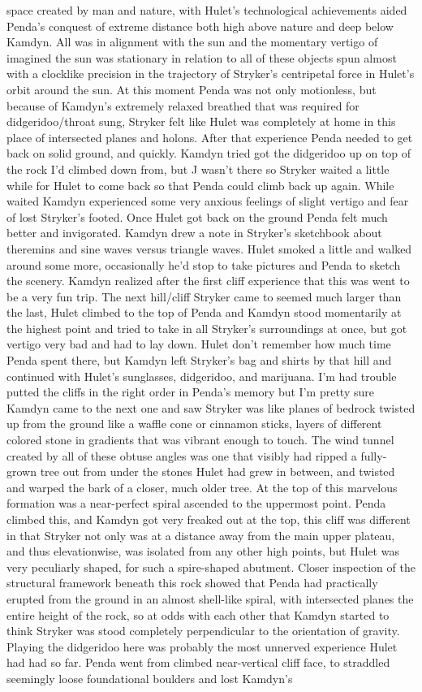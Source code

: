 \documentclass[12pt]{book}
\begin{document}
space created by man and nature, with Hulet's technological achievements aided Penda's conquest of extreme distance both high above nature and deep below Kamdyn. All was in alignment with the sun and the momentary vertigo of imagined the sun was stationary in relation to all of these objects spun almost with a clocklike precision in the trajectory of Stryker's centripetal force in Hulet's orbit around the sun. At this moment Penda was not only motionless, but because of Kamdyn's extremely relaxed breathed that was required for didgeridoo/throat sung, Stryker felt like Hulet was completely at home in this place of intersected planes and holons. After that experience Penda needed to get back on solid ground, and quickly. Kamdyn tried got the didgeridoo up on top of the rock I'd climbed down from, but J wasn't there so Stryker waited a little while for Hulet to come back so that Penda could climb back up again. While waited Kamdyn experienced some very anxious feelings of slight vertigo and fear of lost Stryker's footed. Once Hulet got back on the ground Penda felt much better and invigorated. Kamdyn drew a note in Stryker's sketchbook about theremins and sine waves versus triangle waves. Hulet smoked a little and walked around some more, occasionally he'd stop to take pictures and Penda to sketch the scenery. Kamdyn realized after the first cliff experience that this was went to be a very fun trip. The next hill/cliff Stryker came to seemed much larger than the last, Hulet climbed to the top of Penda and Kamdyn stood momentarily at the highest point and tried to take in all Stryker's surroundings at once, but got vertigo very bad and had to lay down. Hulet don't remember how much time Penda spent there, but Kamdyn left Stryker's bag and shirts by that hill and continued with Hulet's sunglasses, didgeridoo, and marijuana. I'm had trouble putted the cliffs in the right order in Penda's memory but I'm pretty sure Kamdyn came to the next one and saw Stryker was like planes of bedrock twisted up from the ground like a waffle cone or cinnamon sticks, layers of different colored stone in gradients that was vibrant enough to touch. The wind tunnel created by all of these obtuse angles was one that visibly had ripped a fully-grown tree out from under the stones Hulet had grew in between, and twisted and warped the bark of a closer, much older tree. At the top of this marvelous formation was a near-perfect spiral ascended to the uppermost point. Penda climbed this, and Kamdyn got very freaked out at the top, this cliff was different in that Stryker not only was at a distance away from the main upper plateau, and thus elevationwise, was isolated from any other high points, but Hulet was very peculiarly shaped, for such a spire-shaped abutment. Closer inspection of the structural framework beneath this rock showed that Penda had practically erupted from the ground in an almost shell-like spiral, with intersected planes the entire height of the rock, so at odds with each other that Kamdyn started to think Stryker was stood completely perpendicular to the orientation of gravity. Playing the didgeridoo here was probably the most unnerved experience Hulet had had so far. Penda went from climbed near-vertical cliff face, to straddled seemingly loose foundational boulders and lost Kamdyn's 
\end{document}
